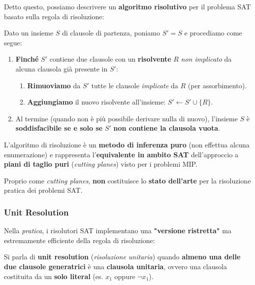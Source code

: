 Detto questo, possiamo descrivere un \textbf{algoritmo risolutivo} per il problema SAT 
basato sulla regola di risoluzione:

\begin{definition}
    Dato un insieme $S$ di clausole di partenza, poniamo $S' = S$ e procediamo come segue:
    \begin{enumerate}
        \item \textbf{Finché} $S'$ contiene due clausole con un \textbf{risolvente} $R$ 
            \textit{non implicato} da alcuna clausola già presente in $S'$:
            \begin{enumerate}
                \item \textbf{Rimuoviamo} da $S'$ tutte le clausole \textit{implicate} da $R$ 
                    (per assorbimento).
                \item \textbf{Aggiungiamo} il nuovo risolvente all'insieme: $S' \leftarrow S' \cup \{R\}$.
            \end{enumerate}
        \item Al termine (quando non è più possibile derivare nulla di nuovo), l'insieme 
            $S$ è \textbf{soddisfacibile se e solo se} $S'$ \textbf{non contiene la clausola vuota}.
    \end{enumerate}
\end{definition}

\begin{remark}
    L'algoritmo di risoluzione è un \textbf{metodo di inferenza puro} (non effettua alcuna 
    enumerazione) e rappresenta l'\textbf{equivalente in ambito SAT} dell'approccio a 
    \textbf{piani di taglio puri} (\textit{cutting planes}) visto per i problemi MIP.

    Proprio come \textit{cutting planes}, \textbf{non} costituisce lo \textbf{stato dell'arte} per la 
    risoluzione pratica dei problemi SAT.
\end{remark}

\subsubsection{Unit Resolution}

Nella \textit{pratica}, i risolutori SAT implementano una \textbf{"versione ristretta"} ma 
estremamente efficiente della regola di risoluzione:

\begin{definition}
    Si parla di \textbf{unit resolution} (\textit{risoluzione unitaria}) quando 
    \textbf{almeno una delle due clausole generatrici} è una \textbf{clausola unitaria}, 
    ovvero una clausola costituita da un \textbf{solo literal} (es. $x_1$ oppure $\neg x_1$).
\end{definition}

